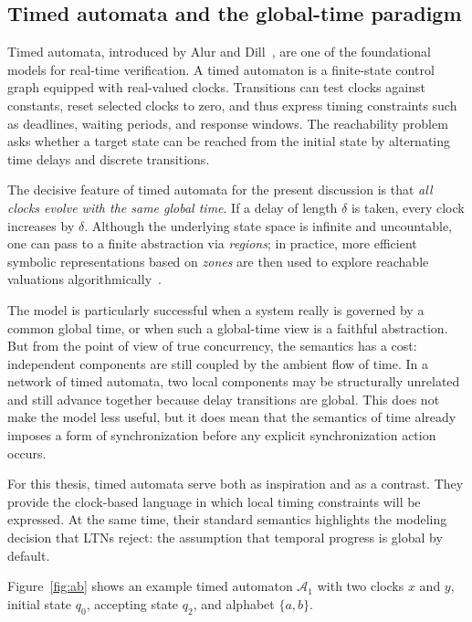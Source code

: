 \subsection{Timed automata and the global-time paradigm}

Timed automata, introduced by Alur and Dill~\cite{AlurDillTA}, are one of the foundational models for real-time verification. A timed automaton is a finite-state control graph equipped with real-valued clocks. Transitions can test clocks against constants, reset selected clocks to zero, and thus express timing constraints such as deadlines, waiting periods, and response windows. The reachability problem asks whether a target state can be reached from the initial state by alternating time delays and discrete transitions.

The decisive feature of timed automata for the present discussion is that \emph{all clocks evolve with the same global time}. If a delay of length $\delta$ is taken, every clock increases by $\delta$.  Although the underlying state space is infinite and uncountable, one can pass to a finite abstraction via \emph{regions}; in practice, more efficient symbolic representations based on \emph{zones} are then used to explore reachable valuations algorithmically~\cite{AlurDillTA,DillPhD}.

The model is particularly successful when a system really is governed by a common global time, or when such a global-time view is a faithful abstraction. But from the point of view of true concurrency, the semantics has a cost: independent components are still coupled by the ambient flow of time. In a network of timed automata, two local components may be structurally unrelated and still advance together because delay transitions are global. This does not make the model less useful, but it does mean that the semantics of time already imposes a form of synchronization before any explicit synchronization action occurs.

For this thesis, timed automata serve both as inspiration and as a contrast. They provide the clock-based language in which local timing constraints will be expressed. At the same time, their standard semantics highlights the modeling decision that LTNs reject: the assumption that temporal progress is global by default.

Figure~\ref{fig:ab} shows an example timed automaton \(\mathcal{A}_1\) with two clocks \(x\) and \(y\), initial state \(q_0\), accepting state \(q_2\), and alphabet \(\{a,b\}\).

